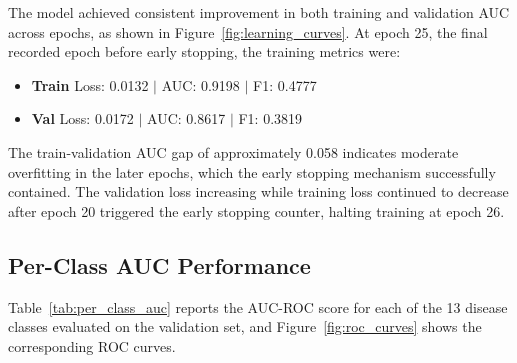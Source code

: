 The model achieved consistent improvement in both training and validation AUC across epochs, as shown in Figure~\ref{fig:learning_curves}. At epoch 25, the final recorded epoch before early stopping, the training metrics were:

\begin{itemize}
    \item \textbf{Train} Loss: 0.0132 $|$ AUC: 0.9198 $|$ F1: 0.4777
    \item \textbf{Val} Loss: 0.0172 $|$ AUC: 0.8617 $|$ F1: 0.3819
\end{itemize}

The train-validation AUC gap of approximately 0.058 indicates moderate overfitting in the later epochs, which the early stopping mechanism successfully contained. The validation loss increasing while training loss continued to decrease after epoch 20 triggered the early stopping counter, halting training at epoch 26.

\subsection{Per-Class AUC Performance}

Table~\ref{tab:per_class_auc} reports the AUC-ROC score for each of the 13 disease classes evaluated on the validation set, and Figure~\ref{fig:roc_curves} shows the corresponding ROC curves.

